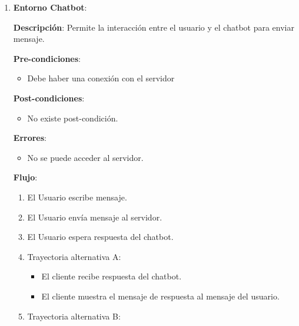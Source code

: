 \noindent\makebox[\linewidth]{\rule{\textwidth}{0.4pt}}
\begin{enumerate}[leftmargin=2.5cm ,label={\bfseries CU-\arabic*}]
    
    \item \textbf{Entorno Chatbot}: 
    
        \textbf{Descripción}: Permite la interacción entre el usuario y el chatbot para enviar mensaje.
        
        \textbf{Pre-condiciones}: 
        
        \begin{itemize}
            \item Debe haber una conexión con el servidor
        \end{itemize}
        
        \textbf{Post-condiciones}: 
        
        \begin{itemize}
            \item No existe post-condición.
        \end{itemize}
        
        \textbf{Errores}: 
        
        \begin{itemize}
            \item No se puede acceder al servidor.
        \end{itemize}
        
        \textbf{Flujo}:
        
        \begin{enumerate}[label=\arabic*)]
            \item El Usuario escribe mensaje.
            \item El Usuario envía mensaje al servidor.
            \item El Usuario espera respuesta del chatbot.
            \item Trayectoria alternativa A:

                \begin{itemize}
                    \item El cliente recibe respuesta del chatbot.
                    \item El cliente muestra el mensaje de respuesta al mensaje del usuario.
                \end{itemize}

            \item Trayectoria alternativa B:


\end{enumerate}
\end{enumerate}
